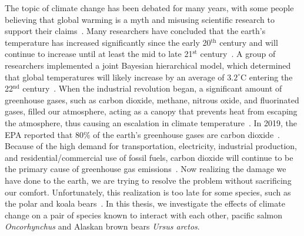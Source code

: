 The topic of climate change has been debated for many years, with some people believing that global warming is a myth and misusing scientific research to support their claims~\cite{allchin2015global}.
Many researchers have concluded that the earth's temperature has increased significantly since the early 20$^\text{th}$ century and will continue to increase until at least the mid to late 21$^\text{st}$ century~\cite{hansen2006global,raftery2017less,osterkamp1990thermal}.
A group of researchers implemented a joint Bayesian hierarchical model, which determined that global temperatures will likely increase by an average of $3.2^{\circ}$C entering the 22$^\text{nd}$ century~\cite{raftery2017less}.
When the industrial revolution began, a significant amount of greenhouse gases, such as carbon dioxide, methane, nitrous oxide, and fluorinated gases, filled our atmosphere, acting as a canopy that prevents heat from escaping the atmosphere, thus causing an escalation in climate temperature~\cite{crowley2000causes, osterkamp1990thermal, epagreen}.
In 2019, the EPA reported that 80\% of the earth's greenhouse gases are carbon dioxide~\cite{epagreen}.
Because of the high demand for transportation, electricity, industrial production, and residential/commercial use of fossil fuels, carbon dioxide will continue to be the primary cause of greenhouse gas emissions~\cite{epagreen}.
Now realizing the damage we have done to the earth, we are trying to resolve the problem without sacrificing our comfort. 
Unfortunately, this realization is too late for some species, such as the polar and koala bears~\cite{adams2011modelling,wiig2008effects, stirling2012effects}.
In this thesis, we investigate the effects of climate change on a pair of species known to interact with each other, pacific salmon \emph{Oncorhynchus} and Alaskan brown bears \emph{Ursus arctos}.

